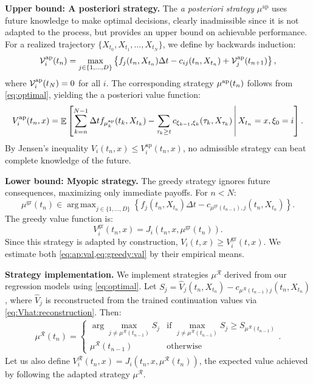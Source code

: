 \documentclass[11pt,reqno,a4paper]{amsart}
\theoremstyle{definition}
\numberwithin{equation}{section}
\newcommand{\Mid}{\,\middle\vert \,}
\DeclareMathOperator{\E}{\mathbb{E}}
\DeclareMathOperator{\1}{\mathbbm{1}}
\DeclareMathOperator*{\argmax}{arg\,max}
\begin{document}
\textbf{Upper bound: A posteriori strategy.} The \emph{a posteriori strategy} $\mu^{\text{ap}}$ uses future knowledge to make optimal decisions, clearly inadmissible since it is not adapted to the process, but provides an upper bound on achievable performance. For a realized trajectory $\{X_{t_0},X_{t_1},\ldots,X_{t_N}\}$, we define by backwards induction:
\begin{equation*}
  \mathcal{V}^{\textnormal{ap}}_{i}(t_n) = \max_{j \in \{1, \ldots, D\}} \left\{ f_j(t_n,X_{t_n}) \Delta t - c_{ij}(t_n,X_{t_n}) + \mathcal{V}^{\textnormal{ap}}_{j}(t_{n+1}) \right\},
\end{equation*}
where $\mathcal{V}^{\textnormal{ap}}_{i}(t_N) = 0$ for all $i$. The corresponding strategy $\mu^{\textnormal{ap}}(t_n)$ follows from \cref{eq:optimal}, yielding the a posteriori value function:
\begin{equation}\label{eq:ap:val}
  V^{\text{ap}}_i(t_n, x) = \E \left[ \sum_{k=n}^{N-1}\Delta t f_{\mu^{\textnormal{ap}}_k}(t_k,X_{t_k}) - \sum_{\tau_k\geq t} c_{\xi_{k-1},\xi_{k}}(\tau_k,X_{\tau_k}) \Mid X_{t_n} = x,\xi_{0} = i \right].
\end{equation}
By Jensen's inequality $V_i(t_n,x) \leq V_{i}^{\text{ap}}(t_n,x)$, no admissible strategy can beat complete knowledge of the future.

\textbf{Lower bound: Myopic strategy.} The greedy strategy ignores future consequences, maximizing only immediate payoffs. For $n < N$:
\begin{equation}\label{eq:greedy:strategy}
  \mu^{\text{gr}}(t_n) \in \argmax_{j \in \{1, \ldots, D\}}
  \left\{ f_j(t_n,X_{t_n}) \Delta t - c_{\mu^{\text{gr}}(t_{n-1}), j}(t_n,X_{t_n}) \right\}.
\end{equation}
The greedy value function is:
\begin{equation}\label{eq:greedy:val}
  V^{\text{gr}}_i(t_n,x) = J_i(t_n,x,\mu^{\text{gr}}(t_n)).
\end{equation}
Since this strategy is adapted by construction, $V_i(t,x) \geq V_{i}^{\text{gr}}(t,x)$. We estimate both \cref{eq:ap:val,eq:greedy:val} by their empirical means.

\textbf{Strategy implementation.} We implement strategies $\mu^\mathcal{R}$ derived from our regression models using \cref{eq:optimal}. Let $S_{j} = \widehat{V}_{j}(t_{n},X_{t_n}) - c_{\mu^\mathcal{R}(t_{n-1})j}(t_n,X_{t_n})$, where $\widehat{V}_j$ is reconstructed from the trained continuation values via \cref{eq:Vhat:reconstruction}. Then:
\begin{align}
  \mu^{\mathcal{R}}(t_n) =
  \begin{cases}
    \arg\max_{j \neq \mu^{\mathcal{R}}(t_{n-1})} S_j & \text{if } \max_{j \neq \mu^{\mathcal{R}}(t_{n-1})} S_j \geq S_{\mu^{\mathcal{R}}(t_{n-1})} \\
    \mu^{\mathcal{R}}(t_{n-1})                       & \text{otherwise}
  \end{cases}.
\end{align}
Let us also define $V^{\mathcal{R}}_i(t_n,x) = J_i(t_n,x,\mu^{\mathcal{R}}(t_n))$, the expected value achieved by following the adapted strategy $\mu^{\mathcal{R}}$.
\end{document}
